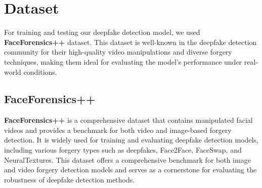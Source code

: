 \section{Dataset}
For training and testing our deepfake detection model, we used \textbf{FaceForensics++} dataset. This dataset is well-known in the deepfake detection community for their high-quality video manipulations and diverse forgery techniques, making them ideal for evaluating the model's performance under real-world conditions.
\subsection{FaceForensics++} \textbf{FaceForensics++} is a comprehensive dataset that contains manipulated facial videos and provides a benchmark for both video and image-based forgery detection. It is widely used for training and evaluating deepfake detection models, including various forgery types such as deepfakes, Face2Face, FaceSwap, and NeuralTextures. This dataset offers a comprehensive benchmark for both image and video forgery detection models and serves as a cornerstone for evaluating the robustness of deepfake detection methods.